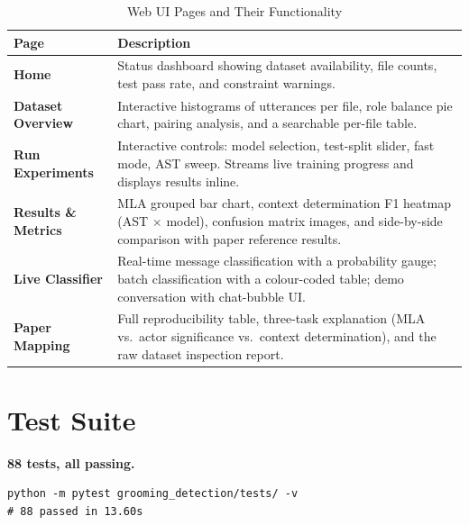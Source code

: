 \documentclass[12pt,a4paper]{article}
\begin{document}
\begin{table}[H]
  \centering
  \caption{Web UI Pages and Their Functionality}
  \begin{tabularx}{\linewidth}{>{\bfseries}lX}
    \toprule
    Page & Description \\
    \midrule
    Home &
      Status dashboard showing dataset availability, file counts, test
      pass rate, and constraint warnings. \\
    \addlinespace
    Dataset Overview &
      Interactive histograms of utterances per file, role balance pie
      chart, pairing analysis, and a searchable per-file table. \\
    \addlinespace
    Run Experiments &
      Interactive controls: model selection, test-split slider, fast mode,
      AST sweep. Streams live training progress and displays results
      inline. \\
    \addlinespace
    Results \& Metrics &
      MLA grouped bar chart, context determination F1 heatmap (AST
      $\times$ model), confusion matrix images, and side-by-side
      comparison with paper reference results. \\
    \addlinespace
    Live Classifier &
      Real-time message classification with a probability gauge; batch
      classification with a colour-coded table; demo conversation with
      chat-bubble UI. \\
    \addlinespace
    Paper Mapping &
      Full reproducibility table, three-task explanation (MLA vs.\
      actor significance vs.\ context determination), and the raw
      dataset inspection report. \\
    \bottomrule
  \end{tabularx}
  \label{tab:ui_pages}
\end{table}

\section{Test Suite}

\textbf{88 tests, all passing.}

\begin{lstlisting}
python -m pytest grooming_detection/tests/ -v
# 88 passed in 13.60s
\end{lstlisting}
\end{document}

